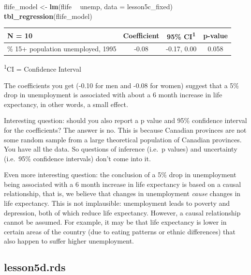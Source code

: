\documentclass[]{book}
\newenvironment{Shaded}{\begin{snugshade}}{\end{snugshade}}
\newcommand{\DataTypeTok}[1]{\textcolor[rgb]{0.13,0.29,0.53}{#1}}
\newcommand{\KeywordTok}[1]{\textcolor[rgb]{0.13,0.29,0.53}{\textbf{#1}}}
\newcommand{\NormalTok}[1]{#1}
\newcommand{\OperatorTok}[1]{\textcolor[rgb]{0.81,0.36,0.00}{\textbf{#1}}}
\newcommand{\StringTok}[1]{\textcolor[rgb]{0.31,0.60,0.02}{#1}}
\begin{document}
\begin{Shaded}
\begin{Highlighting}[]
\NormalTok{flife_model <-}\StringTok{ }\KeywordTok{lm}\NormalTok{(flife }\OperatorTok{~}\StringTok{ }\NormalTok{unemp, }\DataTypeTok{data =}\NormalTok{ lesson5c_fixed)}
\KeywordTok{tbl_regression}\NormalTok{(flife_model)}
\end{Highlighting}
\end{Shaded}

\captionsetup[table]{labelformat=empty,skip=1pt}
\begin{longtable}{lccc}
\toprule
\textbf{N = 10} & \textbf{Coefficient} & \textbf{95\% CI}\textsuperscript{1} & \textbf{p-value} \\ 
\midrule
\% 15+ population unemployed, 1995 & -0.08 & -0.17, 0.00 & 0.058 \\ 
\bottomrule
\end{longtable}
\vspace{-5mm}
\begin{minipage}{\linewidth}
\textsuperscript{1}CI = Confidence Interval \\ 
\end{minipage}

The coefficients you get (-0.10 for men and -0.08 for women) suggest
that a 5\% drop in unemployment is associated with about a 6 month
increase in life expectancy, in other words, a small effect.

Interesting question: should you also report a p value and 95\%
confidence interval for the coefficients? The answer is no. This is
because Canadian provinces are not some random sample from a large
theoretical population of Canadian provinces. You have all the data. So
questions of inference (i.e.~p values) and uncertainty (i.e.~95\%
confidence intervals) don't come into it.

Even more interesting question: the conclusion of a 5\% drop in
unemployment being associated with a 6 month increase in life expectancy
is based on a causal relationship, that is, we believe that changes in
unemployment \emph{cause} changes in life expectancy. This is not
implausible: unemployment leads to poverty and depression, both of which
reduce life expectancy. However, a causal relationship cannot be
assumed. For example, it may be that life expectancy is lower in certain
areas of the country (due to eating patterns or ethnic differences) that
also happen to suffer higher unemployment.

\hypertarget{lesson5d.rds}{%
\subsection{lesson5d.rds}\label{lesson5d.rds}}
\end{document}
